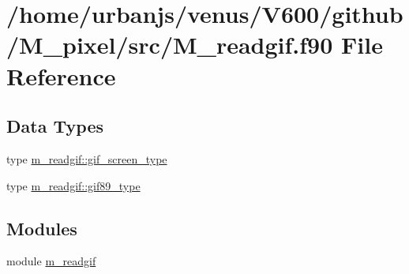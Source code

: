 \hypertarget{M__readgif_8f90}{}\section{/home/urbanjs/venus/\+V600/github/\+M\+\_\+pixel/src/\+M\+\_\+readgif.f90 File Reference}
\label{M__readgif_8f90}
\subsection*{Data Types}
\begin{DoxyCompactItemize}
\item 
type \mbox{\hyperlink{structm__readgif_1_1gif__screen__type}{m\+\_\+readgif\+::gif\+\_\+screen\+\_\+type}}
\item 
type \mbox{\hyperlink{structm__readgif_1_1gif89__type}{m\+\_\+readgif\+::gif89\+\_\+type}}
\end{DoxyCompactItemize}
\subsection*{Modules}
\begin{DoxyCompactItemize}
\item 
module \mbox{\hyperlink{namespacem__readgif}{m\+\_\+readgif}}
\end{DoxyCompactItemize}
